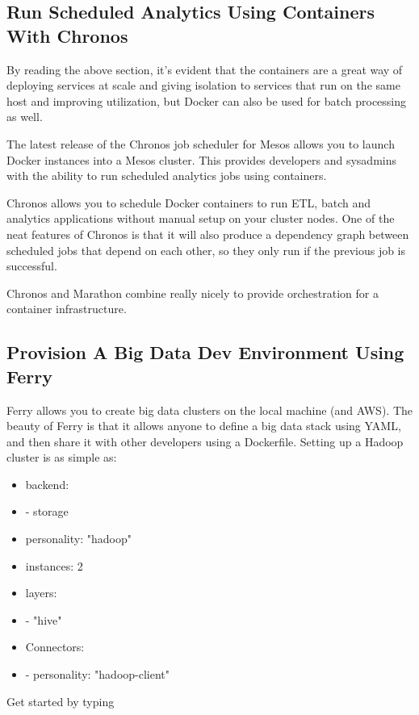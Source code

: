 \documentclass[sigconf]{acmart}
\begin{document}
	\subsection{Run Scheduled Analytics Using Containers With Chronos}
	By reading the above section, it's evident that the containers are a great way of deploying services at scale and giving isolation to services that run on the same host and improving utilization, but Docker can also be used for batch processing as well.
	
	The latest release of the Chronos job scheduler for Mesos allows you to launch Docker instances into a Mesos cluster. This provides developers and sysadmins with the ability to run scheduled analytics jobs using containers.\cite{Chronos}
	
	Chronos allows you to schedule Docker containers to run ETL, batch and analytics applications without manual setup on your cluster nodes. One of the neat features of Chronos is that it will also produce a dependency graph between scheduled jobs that depend on each other, so they only run if the previous job is successful.
	
	Chronos and Marathon combine really nicely to provide orchestration for a container infrastructure.
	
	\subsection{Provision A Big Data Dev Environment Using Ferry}
	Ferry allows you to create big data clusters on the local machine (and AWS). The beauty of Ferry is that it allows anyone to define a big data stack using YAML, and then share it with other developers using a Dockerfile.\cite{Ferry}
	Setting up a Hadoop cluster is as simple as:
	
	
	\begin{itemize}
		\item[]\noindent backend:
		\item[] - storage 
		\item[] personality: "hadoop"
		\item[] instances: 2
		\item[] layers:
		\item[] - "hive"
		\item[]\noindent Connectors: 
		\item[] - personality: "hadoop-client"
	\end{itemize}	
	
	Get started by typing
	
\end{document}
